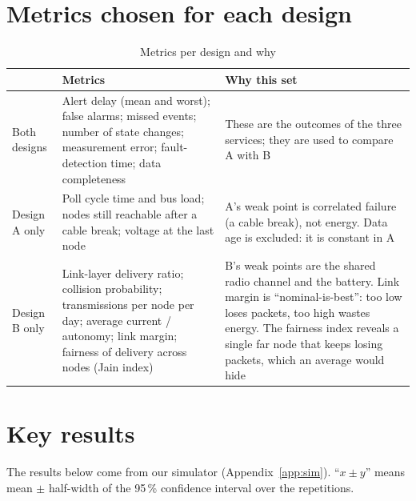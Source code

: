 \documentclass[11pt,a4paper]{report}
\begin{document}
\section{Metrics chosen for each design}
\begin{table}[htbp]
\centering
\caption{Metrics per design and why}\label{tab:metrics}
\small
\begin{tabularx}{\textwidth}{>{\raggedright\arraybackslash}p{2.2cm} Y Y}
\toprule
& \textbf{Metrics} & \textbf{Why this set}\\
\midrule
Both designs & Alert delay (mean and worst); false alarms; missed events; number of state changes; measurement error; fault-detection time; data completeness & These are the outcomes of the three services; they are used to compare A with B\\
Design A only & Poll cycle time and bus load; nodes still reachable after a cable break; voltage at the last node & A's weak point is correlated failure (a cable break), not energy. Data age is excluded: it is constant in A\\
Design B only & Link-layer delivery ratio; collision probability; transmissions per node per day; average current / autonomy; link margin; fairness of delivery across nodes (Jain index) & B's weak points are the shared radio channel and the battery. Link margin is ``nominal-is-best'': too low loses packets, too high wastes energy. The fairness index reveals a single far node that keeps losing packets, which an average would hide\\
\bottomrule
\end{tabularx}
\end{table}

\section{Key results}
The results below come from our simulator (Appendix~\ref{app:sim}). ``$x \pm y$'' means mean $\pm$ half-width of the 95\,\% confidence interval over the repetitions.
\end{document}
